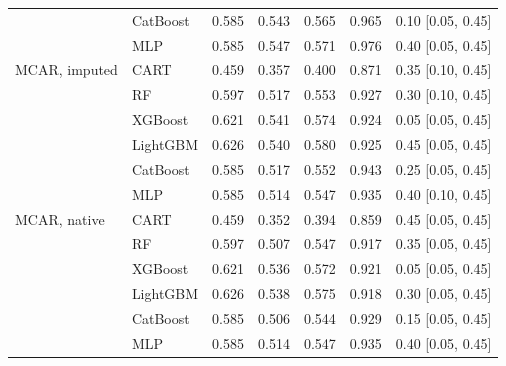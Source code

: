 \begin{table}[p]
\begin{tabular}{@{}llrrrrl@{}}
 & CatBoost & 0.585 & 0.543 & 0.565 & 0.965 & 0.10 [0.05, 0.45] \\
 & MLP & 0.585 & 0.547 & 0.571 & 0.976 & 0.40 [0.05, 0.45] \\
\midrule
MCAR, imputed & CART & 0.459 & 0.357 & 0.400 & 0.871 & 0.35 [0.10, 0.45] \\
 & RF & 0.597 & 0.517 & 0.553 & 0.927 & 0.30 [0.10, 0.45] \\
 & XGBoost & 0.621 & 0.541 & 0.574 & 0.924 & 0.05 [0.05, 0.45] \\
 & LightGBM & 0.626 & 0.540 & 0.580 & 0.925 & 0.45 [0.05, 0.45] \\
 & CatBoost & 0.585 & 0.517 & 0.552 & 0.943 & 0.25 [0.05, 0.45] \\
 & MLP & 0.585 & 0.514 & 0.547 & 0.935 & 0.40 [0.10, 0.45] \\
\midrule
MCAR, native & CART & 0.459 & 0.352 & 0.394 & 0.859 & 0.45 [0.05, 0.45] \\
 & RF & 0.597 & 0.507 & 0.547 & 0.917 & 0.35 [0.05, 0.45] \\
 & XGBoost & 0.621 & 0.536 & 0.572 & 0.921 & 0.05 [0.05, 0.45] \\
 & LightGBM & 0.626 & 0.538 & 0.575 & 0.918 & 0.30 [0.05, 0.45] \\
 & CatBoost & 0.585 & 0.506 & 0.544 & 0.929 & 0.15 [0.05, 0.45] \\
 & MLP & 0.585 & 0.514 & 0.547 & 0.935 & 0.40 [0.05, 0.45] \\
\bottomrule
\end{tabular}
\end{table}
